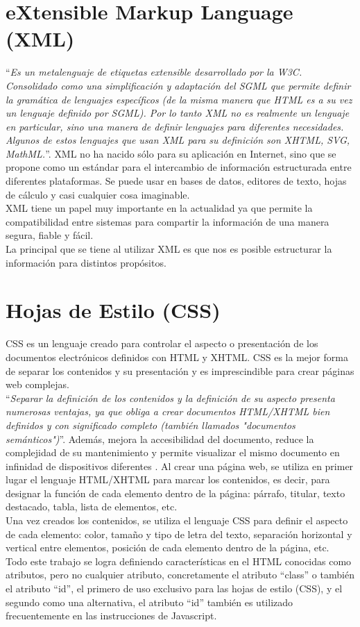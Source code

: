 \section{eXtensible Markup Language (XML)}
``\textit{Es un metalenguaje de etiquetas extensible desarrollado por la W3C. Consolidado como una simplificaci\'on y adaptaci\'on del SGML que permite definir la gram\'atica de lenguajes espec\'ificos (de la misma manera que HTML es a su vez un lenguaje definido por SGML). Por lo tanto XML no es realmente un lenguaje en particular, sino una manera de definir lenguajes para diferentes necesidades. Algunos de estos lenguajes que usan XML para su definici\'on son XHTML, SVG, MathML.}''. \cite{xml}
XML no ha nacido s\'olo para su aplicaci\'on en Internet, sino que se propone como un est\'andar para el intercambio de informaci\'on estructurada entre diferentes plataformas. Se puede usar en bases de datos, editores de texto, hojas de c\'alculo y casi cualquier cosa imaginable.\\
XML tiene un papel muy importante en la actualidad ya que permite la compatibilidad entre sistemas para compartir la informaci\'on de una manera segura, fiable y f\'acil.\\
La principal que se tiene al utilizar XML es que nos es posible estructurar la informaci\'on para distintos prop\'ositos.

\section{Hojas de Estilo (CSS)}
CSS es un lenguaje creado para controlar el aspecto o presentaci\'on de los documentos electr\'onicos definidos con HTML y XHTML. CSS es la mejor forma de separar los contenidos y su presentaci\'on y es imprescindible para crear p\'aginas web complejas.\\
``\textit{Separar la definici\'on de los contenidos y la definici\'on de su aspecto presenta numerosas ventajas, ya que obliga a crear documentos HTML/XHTML bien definidos y con significado completo (tambi\'en llamados "documentos sem\'anticos")}''. Adem\'as, mejora la accesibilidad del documento, reduce la complejidad de su mantenimiento y permite visualizar el mismo documento en infinidad de dispositivos diferentes \cite{css}.
Al crear una p\'agina web, se utiliza en primer lugar el lenguaje HTML/XHTML para marcar  los contenidos, es decir, para designar la funci\'on de cada elemento dentro de la p\'agina: p\'arrafo, titular, texto destacado, tabla, lista de elementos, etc.\\
Una vez creados los contenidos, se utiliza el lenguaje CSS para definir el aspecto de cada elemento: color, tama\~no y tipo de letra del texto, separaci\'on horizontal y vertical entre elementos,  posici\'on de cada elemento dentro de la p\'agina, etc.\\
Todo este trabajo se logra definiendo caracter\'isticas en el HTML conocidas como atributos, pero no cualquier atributo, concretamente el atributo ``class'' o tambi\'en el atributo ``id'', el primero de uso exclusivo para las hojas de estilo (CSS), y el segundo como una alternativa, el atributo ``id'' tambi\'en es utilizado frecuentemente en las instrucciones de Javascript.

